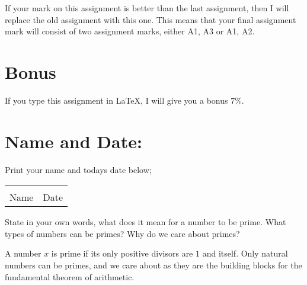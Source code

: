 \documentclass[12pt]{article} %
\begin{document}
  If your mark on this assignment is better than the last assignment, then I will replace the old assignment with
  this one. This means that your final assignment mark will consist of two assignment marks, either A1, A3 or A1,
  A2.

  \section{Bonus}
  If you type this assignment in \LaTeX, I will give you a bonus 7\%.
  
\section{Name and Date:}
	Print your name and todays date below;\\


	\begin{center}
	\noindent\begin{tabular}{ll}
		\makebox[3in]{\hrulefill} & \makebox[3in]{\hrulefill}\\
		Name & Date\\[8ex]%
	\end{tabular}
	\end{center}
	\newpage

  \begin{qstn}
    State in your own words, what does it mean for a number to be prime. What types of numbers can be primes? Why
    do we care about primes?
  \end{qstn}

  \begin{solution}
    A number $x$ is prime if its only positive divisors are $1$ and itself. Only natural numbers can be primes, and
    we care about as they are the building blocks for the fundamental theorem of arithmetic.
  \end{solution}
\end{document}
